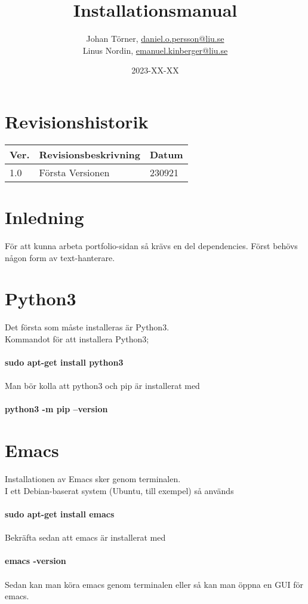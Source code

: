 \documentclass{TDP003mall}
\author{Johan Törner, \url{daniel.o.persson@liu.se}\\
  Linus Nordin, \url{emanuel.kinberger@liu.se}\\}
\title{Installationsmanual}
\date{2023-XX-XX}
\begin{document}
\projectpage
\section{Revisionshistorik}
\begin{table}[!h]
\begin{tabularx}{\linewidth}{|l|X|l|}
\hline
Ver. & Revisionsbeskrivning & Datum \\\hline
1.0 & Första Versionen & 230921 \\\hline
\end{tabularx}
\end{table}


\section{Inledning}
För att kunna arbeta portfolio-sidan så krävs en del dependencies.
Först behövs någon form av text-hanterare.

\section{Python3}
Det första som måste installeras är Python3.\\ 
Kommandot för att installera Python3;\\\\
\textbf{sudo apt-get install python3}\\\\
Man bör kolla att python3 och pip är installerat med\\\\
\textbf{python3 -m pip --version}

\section{Emacs}
Installationen av Emacs sker genom terminalen.\\
I ett Debian-baserat system (Ubuntu, till exempel) så används\\\\
\textbf{sudo apt-get install emacs}\\\\
Bekräfta sedan att emacs är installerat med\\\\
\textbf{emacs -version}\\\\
Sedan kan man köra emacs genom terminalen eller så kan man öppna en GUI för emacs.
\end{document}

